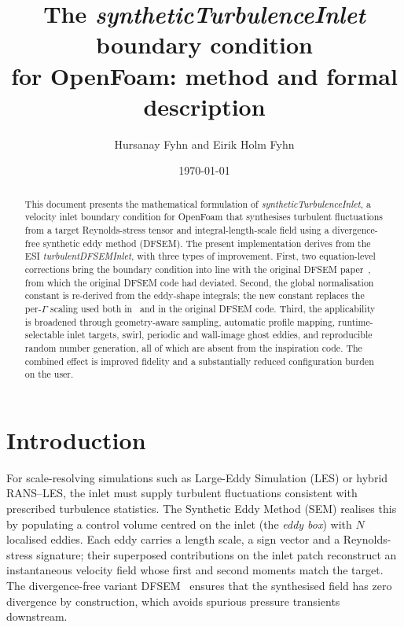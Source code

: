 \documentclass[
 amsmath,amssymb,
 aps,
 twocolumn,
]{revtex4-2}
\begin{document}
\title{The \textit{syntheticTurbulenceInlet} boundary condition\\
       for OpenFoam: method and formal description}
\author{Hursanay Fyhn and Eirik Holm Fyhn}
\date{\today}

\begin{abstract}
This document presents the mathematical formulation of
\textit{syntheticTurbulenceInlet}, a velocity inlet boundary condition for
OpenFoam that synthesises turbulent fluctuations from a target
Reynolds-stress tensor and integral-length-scale field using a
divergence-free synthetic eddy method (DFSEM). The present implementation
derives from the ESI \textit{turbulentDFSEMInlet}, with three types of
improvement. First, two equation-level corrections bring the boundary
condition into line with the original DFSEM paper~\cite{PCR2013}, from
which the original DFSEM code had deviated. Second, the global normalisation
constant is re-derived from the eddy-shape integrals; the new constant
replaces the per-$\Gamma$ scaling used both in~\cite{PCR2013} and in the
original DFSEM code. Third, the
applicability is broadened through geometry-aware sampling, automatic
profile mapping, runtime-selectable inlet targets, swirl, periodic and
wall-image ghost eddies, and reproducible random number generation, all
of which are absent from the inspiration code. The combined effect is
improved fidelity and a substantially reduced configuration burden on
the user.
\end{abstract}

\maketitle

\tableofcontents

\section{Introduction}\label{sec:intro}

For scale-resolving simulations such as Large-Eddy Simulation (LES) or
hybrid RANS--LES, the inlet must supply turbulent fluctuations consistent
with prescribed turbulence statistics. The Synthetic Eddy Method (SEM)
realises this by populating a control volume centred on the inlet (the
\emph{eddy box}) with $N$ localised eddies. Each eddy carries a length
scale, a sign vector and a Reynolds-stress signature; their superposed
contributions on the inlet patch reconstruct an instantaneous velocity
field whose first and second moments match the target. The
divergence-free variant DFSEM~\cite{PCR2013} ensures that the synthesised
field has zero divergence by construction, which avoids spurious pressure
transients downstream.
\end{document}
